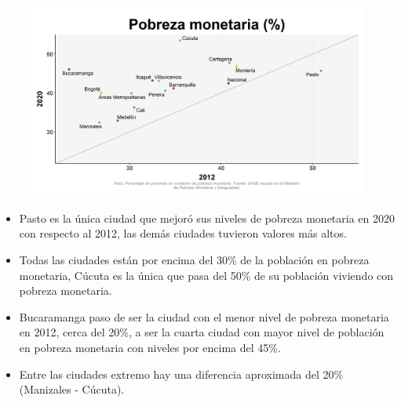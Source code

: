     \begin{figure}[H]
        \caption[Pobreza monetaria por ciudades - 2012 VS 2020 ]{\label{pobreza_monetaria_ciudades_vs} }
        \begin{center}
        \includegraphics[width=\textwidth,keepaspectratio]{img/var_261_scatter_time.png}
        \end{center}
    \end{figure}
            \begin{itemize}
                    \item Pasto es la única ciudad que mejoró sus niveles de pobreza monetaria en 2020 con respecto al 2012, las demás ciudades tuvieron valores más altos.
                    \item Todas las ciudades están por encima del 30\% de la población en pobreza monetaria, Cúcuta es la única que pasa del 50\% de su población viviendo con pobreza monetaria.
                    \item Bucaramanga paso de ser la ciudad con el menor nivel de pobreza monetaria en 2012, cerca del 20\%, a ser la cuarta ciudad con mayor nivel de población en pobreza monetaria con niveles por encima del 45\%.
                    \item Entre las ciudades extremo hay una diferencia aproximada del 20\% (Manizales - Cúcuta).
                    \end{itemize}

